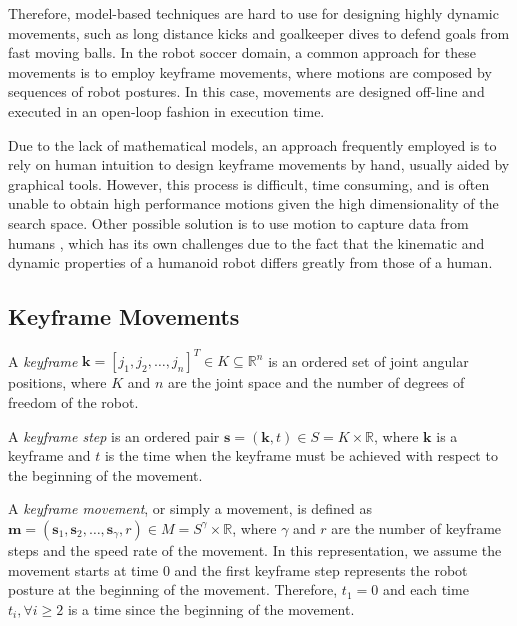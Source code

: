 Therefore, model-based techniques are hard to use for designing highly dynamic movements, such as long distance kicks and goalkeeper dives to defend goals from fast moving balls. In the robot soccer domain, a common approach for these movements is to employ keyframe movements, where motions are composed by sequences of robot postures. In this case, movements are designed off-line and executed in an open-loop fashion in execution time.

Due to the lack of mathematical models, an approach frequently employed is to rely on human intuition to design keyframe movements by hand, usually aided by graphical tools. However, this process is difficult, time consuming, and is often unable to obtain high performance motions given the high dimensionality of the search space. Other possible solution is to use motion to capture data from humans \cite{shon2005}, which has its own challenges due to the fact that the kinematic and dynamic properties of a humanoid robot differs greatly from those of a human.

\subsection{Keyframe Movements}

\begin{definition}
A \emph{keyframe} \( \mathrm{\mathbf{k}} = \left[ j_1, j_2, \dots, j_n \right]^T \in K \subseteq \mathbb{R}^n \) is an ordered set of joint angular positions, where \( K \) and \( n \) are the joint space and the number of degrees of freedom of the robot.
\end{definition}

\begin{definition}
A \emph{keyframe step} is an ordered pair \( \mathrm{\mathbf{s}} = \left( \mathrm{\mathbf{k}}, t \right) \in S = K \times \mathbb{R} \), where \( \mathrm{\mathbf{k}} \) is a keyframe and \( t \) is the time when the keyframe must be achieved with respect to the beginning of the movement. 
\end{definition}

\begin{definition}
A \emph{keyframe movement}, or simply a movement, is defined as \( \mathrm{\mathbf{m}} = \left( \mathrm{\mathbf{s}}_1, \mathrm{\mathbf{s}}_2, \dots, \mathrm{\mathbf{s}}_{\gamma}, r \right) \in M = S^{\gamma} \times \mathbb{R} \), where \( \gamma \) and \( r \) are the number of keyframe steps and the speed rate of the movement. In this representation, we assume the movement starts at time 0 and the first keyframe step represents the robot posture at the beginning of the movement. Therefore, \( t_1 = 0 \) and each time \( t_i, \forall i \geq 2 \) is a time since the beginning of the movement.
\end{definition}

